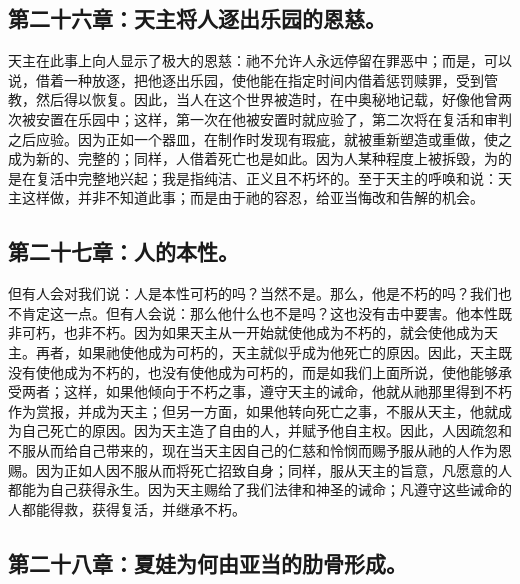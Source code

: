 
\subsection{第二十六章：天主将人逐出乐园的恩慈。}

天主在此事上向人显示了极大的恩慈：祂不允许人永远停留在罪恶中；而是，可以说，借着一种放逐，把他逐出乐园，使他能在指定时间内借着惩罚赎罪，受到管教，然后得以恢复。因此，当人在这个世界被造时，在中奥秘地记载，好像他曾两次被安置在乐园中；这样，第一次在他被安置时就应验了，第二次将在复活和审判之后应验。因为正如一个器皿，在制作时发现有瑕疵，就被重新塑造或重做，使之成为新的、完整的；同样，人借着死亡也是如此。因为人某种程度上被拆毁，为的是在复活中完整地兴起；我是指纯洁、正义且不朽坏的。至于天主的呼唤和说：天主这样做，并非不知道此事；而是由于祂的容忍，给亚当悔改和告解的机会。\par


\subsection{第二十七章：人的本性。}

但有人会对我们说：人是本性可朽的吗？当然不是。那么，他是不朽的吗？我们也不肯定这一点。但有人会说：那么他什么也不是吗？这也没有击中要害。他本性既非可朽，也非不朽。因为如果天主从一开始就使他成为不朽的，就会使他成为天主。再者，如果祂使他成为可朽的，天主就似乎成为他死亡的原因。因此，天主既没有使他成为不朽的，也没有使他成为可朽的，而是如我们上面所说，使他能够承受两者；这样，如果他倾向于不朽之事，遵守天主的诫命，他就从祂那里得到不朽作为赏报，并成为天主；但另一方面，如果他转向死亡之事，不服从天主，他就成为自己死亡的原因。因为天主造了自由的人，并赋予他自主权。因此，人因疏忽和不服从而给自己带来的，现在当天主因自己的仁慈和怜悯而赐予服从祂的人作为恩赐。因为正如人因不服从而将死亡招致自身；同样，服从天主的旨意，凡愿意的人都能为自己获得永生。因为天主赐给了我们法律和神圣的诫命；凡遵守这些诫命的人都能得救，获得复活，并继承不朽。\par


\subsection{第二十八章：夏娃为何由亚当的肋骨形成。}

